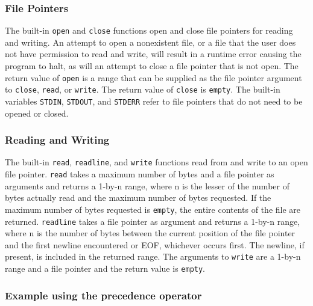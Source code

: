 \subsubsection{File Pointers}
The built-in \texttt{open} and \texttt{close} functions open and close file pointers for reading and writing. An attempt to open a nonexistent file, or a file that the user does not have permission to read and write, will result in a runtime error causing the program to halt, as will an attempt to close a file pointer that is not open. The return value of \texttt{open} is a range that can be supplied as the file pointer argument to \texttt{close}, \texttt{read}, or \texttt{write}. The return value of \texttt{close} is \texttt{empty}. The built-in variables \texttt{STDIN}, \texttt{STDOUT}, and \texttt{STDERR} refer to file pointers that do not need to be opened or closed.
\subsubsection{Reading and Writing}
The built-in \texttt{read}, \texttt{readline}, and \texttt{write} functions read from and write to an open file pointer.  \texttt{read} takes a maximum number of bytes and a file pointer as arguments and returns a 1-by-n range, where n is the lesser of the number of bytes actually read and the maximum number of bytes requested. If the maximum number of bytes requested is \texttt{empty}, the entire contents of the file are returned. \texttt{readline} takes a file pointer as argument and returns a 1-by-n range, where n is the number of bytes between the current position of the file pointer and the first newline encountered or EOF, whichever occurs first. The newline, if present, is included in the returned range. The arguments to \texttt{write} are a 1-by-n range and a file pointer and the return value is \texttt{empty}.
\subsubsection{Example using the precedence operator}

